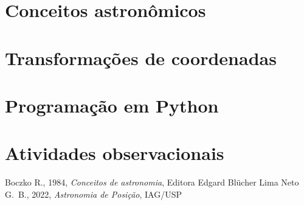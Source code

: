 \documentclass[11pt,a4paper]{report}
\begin{document}




\setcounter{tocdepth}{1}
{
\hypersetup{hidelinks}
\tableofcontents
}

\titleformat{\chapter}[block]
{\flushright\bfseries\Huge}{\color{mygreen}\fontsize{80}{120}\selectfont\thechapter}{0pt~\linebreak[1cm]}{\color{mygreen}\Huge}

\part{Conceitos astronômicos}







\part{Transformações de coordenadas}




\part{Programação em Python}




\part{Atividades observacionais}





 
\titleformat{\chapter}[display]
{\normalfont\huge\bfseries}{\color{mygreen}\chaptertitlename\ \thechapter}{20pt}{\color{mygreen}\Huge}

\begin{thebibliography}{9}
 Boczko R., 1984, \textit{Conceitos de astronomia}, Editora Edgard Bl\"ucher
 Lima Neto G.~B., 2022, \textit{Astronomia de Posição}, IAG/USP
\end{thebibliography}

\clearpage
{
\pagecolor{mygreen}
\thispagestyle{empty}
~
}
\end{document}
